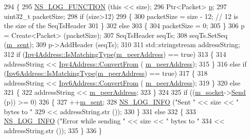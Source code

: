 \begin{DoxyCode}
294 \{
295   \hyperlink{log-macros-disabled_8h_a90b90d5bad1f39cb1b64923ea94c0761}{NS\_LOG\_FUNCTION} (\textcolor{keyword}{this} << size);
296   Ptr<Packet> \hyperlink{lte__link__budget_8m_ac9de518908a968428863f829398a4e62}{p};
297   uint32\_t packetSize;
298   \textcolor{keywordflow}{if} (size>12)
299     \{
300       packetSize = size - 12; \textcolor{comment}{// 12 is the size of the SeqTsHeader}
301     \}
302   \textcolor{keywordflow}{else}
303     \{
304       packetSize = 0;
305     \}
306   p = Create<Packet> (packetSize);
307   SeqTsHeader seqTs;
308   seqTs.SetSeq (\hyperlink{structns3_1_1UdpTraceClient_a226ae5b31c9f4777726bc6cc188c6a85}{m\_sent});
309   p->AddHeader (seqTs);
310 
311   std::stringstream addressString;
312   \textcolor{keywordflow}{if} (\hyperlink{classns3_1_1Ipv4Address_a7129db5e08739783b300976d28c0ced3}{Ipv4Address::IsMatchingType}(\hyperlink{structns3_1_1UdpTraceClient_a23963b5603afc628e516eb1eccb14ad8}{m\_peerAddress}) == \textcolor{keyword}{true})
313     \{
314       addressString << \hyperlink{classns3_1_1Ipv4Address_a5fd4a8f0f7bb75e35dad3d401ef4cbc1}{Ipv4Address::ConvertFrom} (
      \hyperlink{structns3_1_1UdpTraceClient_a23963b5603afc628e516eb1eccb14ad8}{m\_peerAddress});
315     \}
316   \textcolor{keywordflow}{else} \textcolor{keywordflow}{if} (\hyperlink{classns3_1_1Ipv6Address_adbe329370b5a8f7c0f48659d6439dfd1}{Ipv6Address::IsMatchingType}(\hyperlink{structns3_1_1UdpTraceClient_a23963b5603afc628e516eb1eccb14ad8}{m\_peerAddress}) == \textcolor{keyword}{true})
317     \{
318       addressString << \hyperlink{classns3_1_1Ipv6Address_ac00bc221a0b226b2090d05468aec4b79}{Ipv6Address::ConvertFrom} (
      \hyperlink{structns3_1_1UdpTraceClient_a23963b5603afc628e516eb1eccb14ad8}{m\_peerAddress});
319     \}
320   \textcolor{keywordflow}{else}
321     \{
322       addressString << \hyperlink{structns3_1_1UdpTraceClient_a23963b5603afc628e516eb1eccb14ad8}{m\_peerAddress};
323     \}
324 
325   \textcolor{keywordflow}{if} ((\hyperlink{structns3_1_1UdpTraceClient_afdf8d1c4e4d20f4a378eb92ccf5a34d1}{m\_socket}->\hyperlink{classns3_1_1Socket_a036901c8f485fe5b6eab93b7f2ec289d}{Send} (p)) >= 0)
326     \{
327       ++\hyperlink{structns3_1_1UdpTraceClient_a226ae5b31c9f4777726bc6cc188c6a85}{m\_sent};
328       \hyperlink{group__logging_gafbd73ee2cf9f26b319f49086d8e860fb}{NS\_LOG\_INFO} (\textcolor{stringliteral}{"Sent "} << size << \textcolor{stringliteral}{" bytes to "}
329                            << addressString.str ());
330     \}
331   \textcolor{keywordflow}{else}
332     \{
333       \hyperlink{group__logging_gafbd73ee2cf9f26b319f49086d8e860fb}{NS\_LOG\_INFO} (\textcolor{stringliteral}{"Error while sending "} << size << \textcolor{stringliteral}{" bytes to "}
334                                           << addressString.str ());
335     \}
336 \}
\end{DoxyCode}


